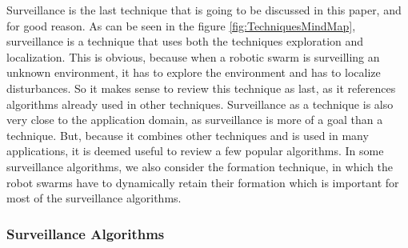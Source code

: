
Surveillance is the last technique that is going to be discussed in this paper, and for good reason. 
As can be seen in the figure \ref{fig:TechniquesMindMap}, surveillance is a technique that uses both the techniques exploration and localization.
This is obvious, because when a robotic swarm is surveilling an unknown environment, it has to explore the environment and has to localize disturbances.
So it makes sense to review this technique as last, as it references algorithms already used in other techniques.  
Surveillance as a technique is also very close to the application domain, as surveillance is more of a goal than a technique. 
But, because it combines other techniques and is used in many applications, it is deemed useful to review a few popular algorithms. 
In some surveillance algorithms, we also consider the formation technique, in which the robot swarms have to dynamically retain their formation which is important for most of the surveillance algorithms. 

\subsubsection{Surveillance Algorithms}

